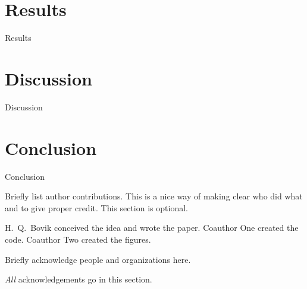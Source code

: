 \documentclass{uai2024} %
\begin{document}
\section{Results}
  Results







\section{Discussion}
  Discussion







\section{Conclusion}
  Conclusion
























\begin{contributions} %
    Briefly list author contributions. 
    This is a nice way of making clear who did what and to give proper credit.
    This section is optional.

    H.~Q.~Bovik conceived the idea and wrote the paper.
    Coauthor One created the code.
    Coauthor Two created the figures.
\end{contributions}

\begin{acknowledgements} %
    Briefly acknowledge people and organizations here.

    \emph{All} acknowledgements go in this section.
\end{acknowledgements}
\end{document}
